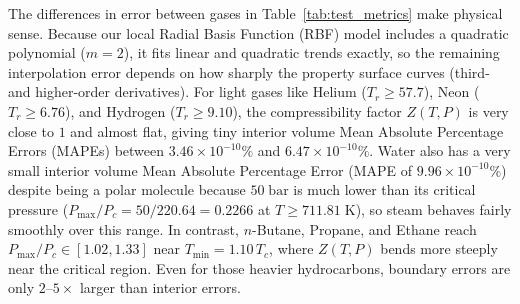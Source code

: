 \documentclass[10pt,a4paper]{article}
\begin{document}
The differences in error between gases in Table~\ref{tab:test_metrics} make physical sense. Because our local Radial Basis Function (RBF) model includes a quadratic polynomial ($m=2$), it fits linear and quadratic trends exactly, so the remaining interpolation error depends on how sharply the property surface curves (third- and higher-order derivatives). For light gases like Helium ($T_r \ge 57.7$), Neon ($T_r \ge 6.76$), and Hydrogen ($T_r \ge 9.10$), the compressibility factor $Z(T,P)$ is very close to $1$ and almost flat, giving tiny interior volume Mean Absolute Percentage Errors (MAPEs) between $3.46\times 10^{-10}\%$ and $6.47\times 10^{-10}\%$. Water also has a very small interior volume Mean Absolute Percentage Error (MAPE of $9.96\times 10^{-10}\%$) despite being a polar molecule because $50\;\mathrm{bar}$ is much lower than its critical pressure ($P_{\max}/P_c = 50 / 220.64 = 0.2266$ at $T \ge 711.81\;\mathrm{K}$), so steam behaves fairly smoothly over this range. In contrast, $n$-Butane, Propane, and Ethane reach $P_{\max}/P_c \in [1.02, 1.33]$ near $T_{\min} = 1.10\,T_c$, where $Z(T,P)$ bends more steeply near the critical region. Even for those heavier hydrocarbons, boundary errors are only $2\text{--}5\times$ larger than interior errors.
\end{document}
